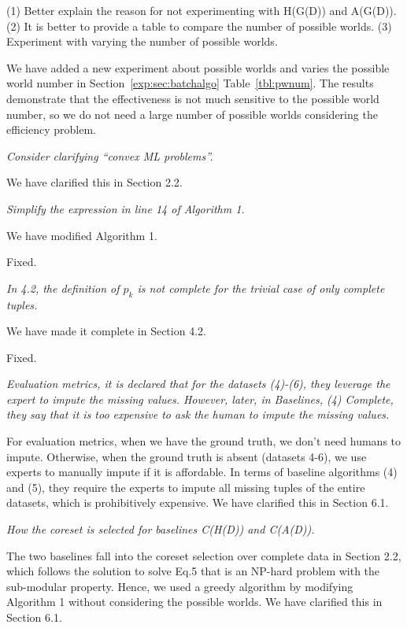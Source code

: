 (1) Better  explain the reason for not experimenting with H(G(D)) and A(G(D)). (2) It is better to provide a table to  compare the number of possible worlds. (3) Experiment with varying the number of possible worlds.

\noindent 
[\textbf{R}] We have added a new experiment about possible worlds and varies the possible world number in Section~\ref{exp:sec:batchalgo} Table~\ref{tbl:pwnum}. The results demonstrate that the effectiveness is not much sensitive to the possible world number, so we do not need a large number of possible worlds considering the efficiency problem.

\textit{Consider clarifying ``convex ML problems''.}

\noindent 
[\textbf{R}]  We have clarified this in Section 2.2.

\textit{Simplify the expression in line 14 of Algorithm 1.}

\noindent 
[\textbf{R}]  We have modified Algorithm 1.

 Fixed.


\textit{In 4.2, the definition of $p_k$ is not complete for the trivial case of only complete tuples.}

\noindent 
[\textbf{R}]  We have made it complete in Section 4.2.

  Fixed.


\textit{Evaluation metrics, it is declared that for the datasets (4)-(6), they leverage the expert to impute the missing values. However, later, in Baselines, (4) Complete, they say that it is too expensive to ask the human to impute the missing values.}

\noindent 
[\textbf{R}] For evaluation metrics, when we have the ground truth, we don't need humans to impute. Otherwise, when the ground truth is absent (datasets 4-6), we use experts to manually impute if it is affordable.
In terms of baseline algorithms (4) and (5), they require the experts to impute all missing tuples of the entire datasets, which is prohibitively expensive. 
We have clarified this in Section 6.1.


\textit{How the coreset is selected for baselines C(H(D)) and C(A(D)).}

\noindent 
[\textbf{R}]  The two baselines fall into the coreset selection over complete data in Section 2.2, which follows the solution to solve Eq.5 that is an NP-hard problem with the sub-modular property. Hence, we used a greedy algorithm by modifying Algorithm 1 without considering the possible worlds. We have clarified this in Section 6.1.

